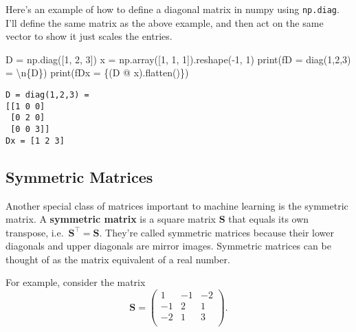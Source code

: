 \documentclass[
  letterpaper,
  DIV=11,
  numbers=noendperiod]{scrreprt}
\newenvironment{Shaded}{\begin{snugshade}}{\end{snugshade}}
\newcommand{\BuiltInTok}[1]{\textcolor[rgb]{0.00,0.23,0.31}{#1}}
\newcommand{\CharTok}[1]{\textcolor[rgb]{0.13,0.47,0.30}{#1}}
\newcommand{\DecValTok}[1]{\textcolor[rgb]{0.68,0.00,0.00}{#1}}
\newcommand{\NormalTok}[1]{\textcolor[rgb]{0.00,0.23,0.31}{#1}}
\newcommand{\OperatorTok}[1]{\textcolor[rgb]{0.37,0.37,0.37}{#1}}
\newcommand{\SpecialCharTok}[1]{\textcolor[rgb]{0.37,0.37,0.37}{#1}}
\newcommand{\SpecialStringTok}[1]{\textcolor[rgb]{0.13,0.47,0.30}{#1}}
\begin{document}
Here's an example of how to define a diagonal matrix in numpy using
\texttt{np.diag}. I'll define the same matrix as the above example, and
then act on the same vector to show it just scales the entries.

\begin{Shaded}
\begin{Highlighting}[]
\NormalTok{D }\OperatorTok{=}\NormalTok{ np.diag([}\DecValTok{1}\NormalTok{, }\DecValTok{2}\NormalTok{, }\DecValTok{3}\NormalTok{])}
\NormalTok{x }\OperatorTok{=}\NormalTok{ np.array([}\DecValTok{1}\NormalTok{, }\DecValTok{1}\NormalTok{, }\DecValTok{1}\NormalTok{]).reshape(}\OperatorTok{{-}}\DecValTok{1}\NormalTok{, }\DecValTok{1}\NormalTok{)}
\BuiltInTok{print}\NormalTok{(}\SpecialStringTok{f\textquotesingle{}D = diag(1,2,3) = }\CharTok{\textbackslash{}n}\SpecialCharTok{\{}\NormalTok{D}\SpecialCharTok{\}}\SpecialStringTok{\textquotesingle{}}\NormalTok{)}
\BuiltInTok{print}\NormalTok{(}\SpecialStringTok{f\textquotesingle{}Dx = }\SpecialCharTok{\{}\NormalTok{(D }\OperatorTok{@}\NormalTok{ x)}\SpecialCharTok{.}\NormalTok{flatten()}\SpecialCharTok{\}}\SpecialStringTok{\textquotesingle{}}\NormalTok{)}
\end{Highlighting}
\end{Shaded}

\begin{verbatim}
D = diag(1,2,3) = 
[[1 0 0]
 [0 2 0]
 [0 0 3]]
Dx = [1 2 3]
\end{verbatim}

\hypertarget{symmetric-matrices}{%
\subsection{Symmetric Matrices}\label{symmetric-matrices}}

Another special class of matrices important to machine learning is the
symmetric matrix. A \textbf{symmetric matrix} is a square matrix
\(\mathbf{S}\) that equals its own transpose,
i.e.~\(\mathbf{S}^\top = \mathbf{S}\). They're called symmetric matrices
because their lower diagonals and upper diagonals are mirror images.
Symmetric matrices can be thought of as the matrix equivalent of a real
number.

For example, consider the matrix \[
\mathbf{S} = 
\begin{pmatrix}
1 & -1 & -2 \\
-1 & 2 & 1 \\
-2 & 1 & 3 \\
\end{pmatrix}.
\]
\end{document}
